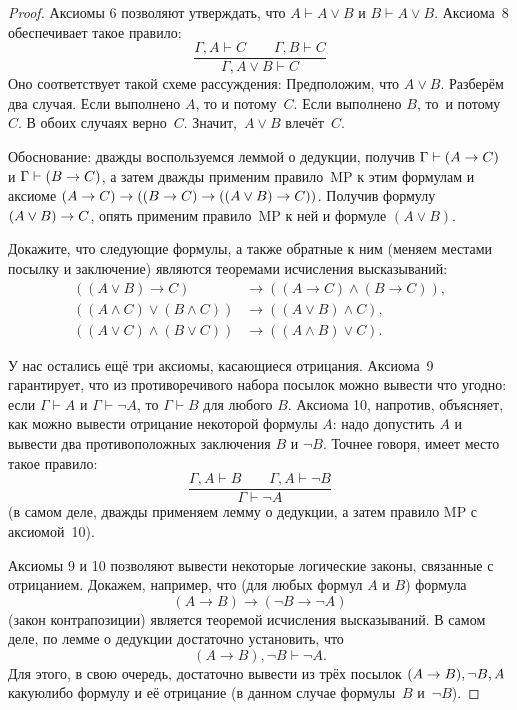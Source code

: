 \begin{proof}
Аксиомы 6 позволяют утверждать, что $A\vdash A\lor B$ и
$B\vdash A\lor B$. Аксиома~8 обеспечивает такое правило:
        $$
\frac{\Gamma, A \vdash C \qquad \Gamma,B\vdash C}{\Gamma, A\lor B\vdash C}
        $$
Оно соответствует такой схеме рассуждения:  Предположим, что
$A\lor B$. Разберём два случая. Если выполнено $A$, то
\hole и потому~$C$. Если выполнено $B$,
то~\hole и потому~$C$. В обоих случаях верно~$C$.
Значит,~$A\lor B$ влечёт~$C$.

Обоснование: дважды воспользуемся
леммой о дедукции, получив $\Gamma\hm\vdash (A\hm\to C)$ и
$\Gamma\hm\vdash(B\hm\to C)$, а затем дважды применим правило~MP
к этим формулам и аксиоме ${(A\to C)}\hm\to ({(B\to C)}\hm\to
({(A\lor B)}\hm\to C))$.
Получив формулу ${(A\lor B)}\hm\to C$, опять применим правило~MP
к ней и формуле $(A\lor B)$.

\begin{problem}
Докажите, что следующие формулы, а также обратные к ним (меняем
местами посылку и заключение) являются теоремами исчисления
высказываний:
        \begin{align*}
((A\lor B)\to C)&\to ((A\to C)\land(B\to C)),\\
((A\land C)\lor (B\land C))&\to ((A\lor B)\land C),\\
((A\lor C)\land (B\lor C))&\to ((A\land B)\lor C).
        \end{align*}
\end{problem}

У нас остались ещё три аксиомы, касающиеся
отрицания. Аксиома~9 гарантирует, что из противоречивого набора
посылок можно вывести что угодно: если $\Gamma\vdash A$ и
$\Gamma\vdash\lnot A$, то $\Gamma\vdash B$ для любого $B$.
Аксиома 10, напротив, объясняет, как можно вывести отрицание
некоторой формулы
$A$: надо допустить $A$ и вывести два противоположных заключения
$B$ и $\lnot B$. Точнее говоря, имеет место такое правило:
        $$
\frac{\Gamma, A\vdash B\qquad \Gamma, A\vdash\lnot B}
     {\Gamma \vdash \lnot A}
        $$
(в самом деле, дважды применяем лемму о дедукции, а затем
правило MP с аксиомой~10).

Аксиомы 9 и 10 позволяют вывести некоторые логические законы,
связанные с отрицанием. Докажем, например, что (для любых формул
$A$ и $B$) формула
        $$
(A\to B)\to(\lnot B\to\lnot A)
        $$
( закон контрапозиции)
является теоремой исчисления высказываний. В самом деле, по
лемме о дедукции достаточно установить, что
        $$
(A\to B), \lnot B \vdash \lnot A.
        $$
Для этого, в свою очередь, достаточно вывести из трёх посылок $(A\hm\to B),
\lnot B, A$ какую\д либо формулу и её отрицание (в данном случае
формулы~$B$ и~$\lnot B$).


\end{proof}
